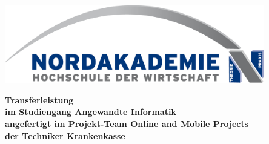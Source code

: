 
\thispagestyle{empty}
\begin{center}
\vspace*{-2cm}
\includegraphics[width=0.85\textwidth]{Bilder/Logo_NAK}\\
\vspace*{1.5cm}
    {\titlefont\huge\onehalfspacing{}
	\thetitle{}
    \par}%
\vfill
{
\vspace*{1.5cm}
    \normalfont\normalcolor\bfseries\large
    Transferleistung \\
    \large
    im Studiengang Angewandte Informatik\\
    angefertigt im Projekt-Team Online and Mobile Projects\\
    der Techniker Krankenkasse\\
    \par
}
\end{center}\par
\noindent\begin{minipage}[b]{\textwidth}
{
  \vspace*{5cm}
  \noindent\textbf{\theLocationAndDate}
}
\end{minipage}
